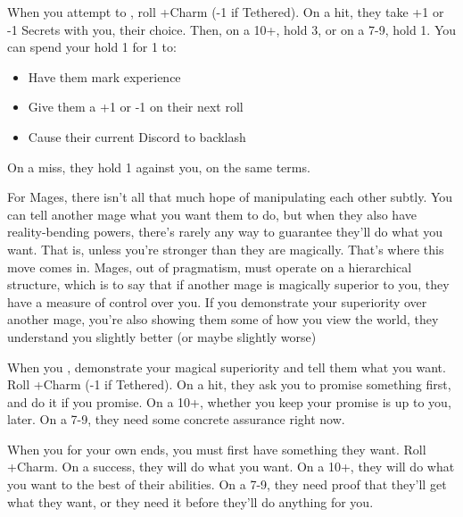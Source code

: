 \begin{multicols}{3}
  \begin{move}
    When you attempt to , roll +Charm (-1 if Tethered). On a hit, they
    take +1 or -1 Secrets with you, their choice. Then, on a 10+, hold
    3, or on a 7-9, hold 1. You can spend your hold 1 for 1 to:
    \begin{itemize}
      \setlength\itemsep{-.5em}
    \item Have them mark experience
    \item Give them a +1 or -1 on their next roll
    \item Cause their current Discord to backlash
    \end{itemize}
    On a miss, they hold 1 against you, on the same terms.
\begin{movedetail}
  For Mages, there isn't all that much hope of manipulating each other
  subtly. You can tell another mage what you want them to do, but when
  they also have reality-bending powers, there's rarely any way to
  guarantee they'll do what you want. That is, unless you're stronger
  than they are magically. That's where this move comes in. Mages, out
  of pragmatism, must operate on a hierarchical structure, which is to
  say that if another mage is magically superior to you, they have a
  measure of control over you. If you demonstrate your superiority
  over another mage, you're also showing them some of how you view the
  world, they understand you slightly better (or maybe slightly worse)
\end{movedetail}
  \end{move}

  \SEPARATOR

  \begin{move}
    When you ,
    demonstrate your magical superiority and tell them what you
    want. Roll +Charm (-1 if Tethered). On a hit, they ask you to
    promise something first, and do it if you promise. On a 10+,
    whether you keep your promise is up to you, later. On a 7-9, they
    need some concrete assurance right now.
  \end{move}

  \SEPARATOR

  \begin{move}
    When you  for your own ends, you must first
    have something they want. Roll +Charm. On a success, they will do
    what you want. On a 10+, they will do what you want to the best of
    their abilities. On a 7-9, they need proof that they'll get what
    they want, or they need it before they'll do anything for you.
  \end{move}


\end{multicols}
